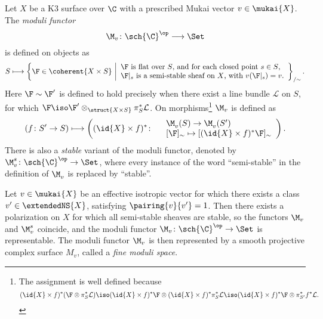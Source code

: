 \begin{definition}
    \label{Definition of moduli functor}
    Let $X$ be a K3 surface over $\C$ with a prescribed Mukai vector $v \in \mukai{X}$. The \emph{moduli functor}
    \[
        \M_v \colon \sch{\C}^\op \longrightarrow \Set
    \]
    is defined on objects as 
    \[
        S \longmapsto \left\{\F \in \coherent{X \times S} \ \middle| 
        \begin{array}{l}
            \text{$\F$ is flat over $S$, and for each closed point $s \in S$,} \\
            \text{$\F|_s$ is a semi-stable sheaf on $X$, with $v(\F|_s) = v$.}
        \end{array}
        \right\}_{/\sim}.
    \]
    Here $\F \sim \F'$ is defined to hold precisely when there exist a line bundle $\mathcal L$ on $S$, for which $\F \iso \F' \otimes_{\struct{X \times S}} \pi_S^*\mathcal L$. On morphisms\footnote{
        The assignment is well defined because
        \[
            (\id{X} \times f)^*(\F \otimes \pi_S^*\mathcal L) \iso (\id{X} \times f)^*\F \otimes (\id{X} \times f)^*\pi_S^*\mathcal L \iso (\id{X} \times f)^*\F \otimes \pi_{S'}^*f^*\mathcal L.
        \]
    } $\M_v$ is defined as
    \[
        (f\colon S' \to S) \longmapsto \left( (\id{X} \times f)^* \colon
            \begin{array}{r l}
                & \M^{}_v(S) \to \M^{}_v(S') \\
                & [\F]_\sim \mapsto [(\id{X} \times f)^*\F]_\sim
            \end{array}
            \right).
    \]
    There is also a \emph{stable} variant of the moduli functor, denoted by $\M_v^{s} \colon \sch{\C}^\op \to \Set$, where every instance of the word ``semi-stable'' in the definition of $\M_v^{}$ is replaced by ``stable''.
\end{definition}


\begin{theorem}
    \label{Representability of moduli functor}
    \textsl{\cite{GottscheHuybrechts1996,huybrechts2006fouriermukai, OGrady1997,HuybrechtsLehn2010,BayerMacri2014}}
    Let $v \in \mukai{X}$ be an effective isotropic vector for which there exists a class $v' \in \extendedNS{X}$, satisfying $\pairing{v}{v'} = 1$. Then there exists a polarization on $X$ for which all semi-stable sheaves are stable, so the functors $\M_v$ and $\M^s_v$ coincide, and the moduli functor $\M_v \colon \sch{\C}^\op \to \Set$ is representable. The moduli functor $\M_v$ is then represented by a smooth projective complex surface $M_v$, called a \emph{fine moduli space}.
\end{theorem}

